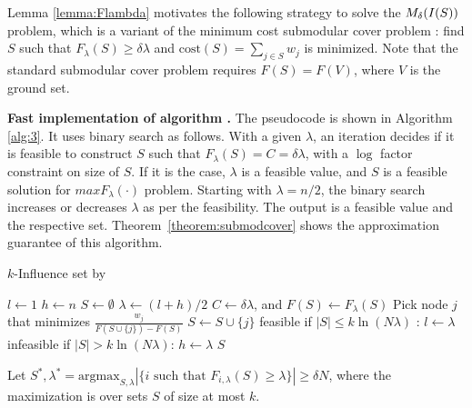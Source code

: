 
Lemma \ref{lemma:Flambda} motivates the following strategy to solve the $\mbox{$M_{\delta}(I(S))$}$ problem, which is a variant of the minimum cost submodular cover problem \cite{fujishige}: find $S$ such that $F_{\lambda}(S)\geq \delta\lambda$ and $\text{cost}(S)=\sum_{j\in S} w_j$ is minimized. Note that the standard submodular cover problem requires $F(S)=F(V)$, where $V$ is the ground set.


\smallskip

\noindent\textbf{Fast implementation of algorithm \multicritalgo{}.} The pseudocode is shown in Algorithm \ref{alg:3}. It uses binary search as follows. With a given $\lambda$, an iteration decides if it is feasible to construct $S$ such that $F_{\lambda}(S)=C=\delta \lambda$, with a $\log$ factor constraint on size of $S$. If it is the case, $\lambda$ is a feasible value, and $S$ is a feasible solution for $max F_{\lambda}(\cdot)$ problem. Starting with $\lambda=n/2$, the binary search increases or decreases $\lambda$ as per the feasibility. The output is a feasible value and the respective set. Theorem~\ref{theorem:submodcover} shows the approximation guarantee of this algorithm.

\begin{algorithm}[t]
\footnotesize
\caption{$k$-Influence set by \multicritalgo{}}
\label{alg:3}
\begin{algorithmic}[1]
  \State $l \gets 1$
  \State $h \gets n$
    \State $S \gets \emptyset$
    \State $\lambda \gets (l+h)/2$
    \State $C \gets \delta\lambda$, and $F(S) \gets F_{\lambda}(S)$
          \State Pick node $j$ that minimizes $\frac{w_j}{F(S\cup\{j\}) - F(S)}$
        \State $S \gets S \cup \{j\}$
      \EndWhile
    \State feasible if $|S| \le k\ln(N \lambda)$ : $l \gets \lambda$
    \State infeasible if $|S| > k\ln(N\lambda)$: $h \gets \lambda$
  \EndFor
  \Return $S$
  \EndFunction
\end{algorithmic}
\end{algorithm}

Let $S^*, \lambda^*=\mbox{argmax}_{S, \lambda} |\{i\mbox{ such that }F_{i,\lambda}(S)\geq \lambda\}|\geq \delta N$, where the maximization is over sets $S$ of size at most $k$.

